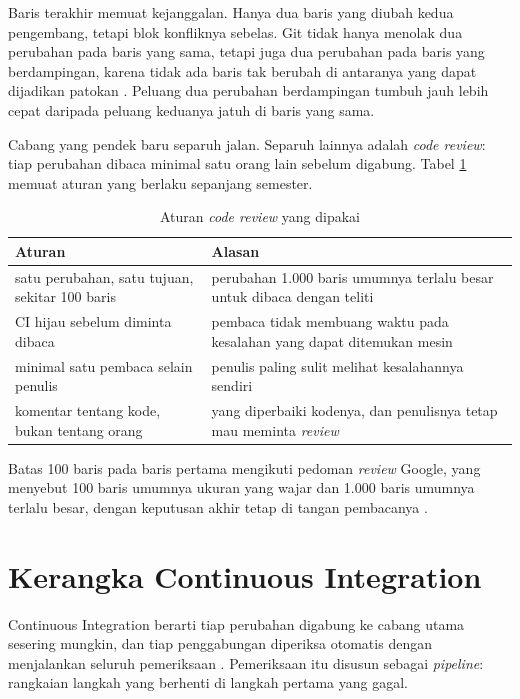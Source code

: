 Baris terakhir memuat kejanggalan. Hanya dua baris yang diubah kedua
pengembang, tetapi blok konfliknya sebelas. Git tidak hanya menolak dua
perubahan pada baris yang sama, tetapi juga dua perubahan pada baris yang
berdampingan, karena tidak ada baris tak berubah di antaranya yang dapat
dijadikan patokan \cite{chacon2014progit}. Peluang dua perubahan berdampingan
tumbuh jauh lebih cepat daripada peluang keduanya jatuh di baris yang sama.

Cabang yang pendek baru separuh jalan. Separuh lainnya adalah
\textit{code review}: tiap perubahan dibaca minimal satu orang lain sebelum
digabung. Tabel \ref{tab:review01} memuat aturan yang berlaku sepanjang
semester.

\begin{table}[!htb]
  \centering
  \caption{Aturan \textit{code review} yang dipakai}
  \label{tab:review01}
  \begin{tabularx}{\textwidth}{XX}
    \hline
    \textbf{Aturan} & \textbf{Alasan} \\
    \hline
    satu perubahan, satu tujuan, sekitar 100 baris & perubahan 1.000 baris umumnya terlalu besar untuk dibaca dengan teliti \\
    \hline
    CI hijau sebelum diminta dibaca & pembaca tidak membuang waktu pada kesalahan yang dapat ditemukan mesin \\
    \hline
    minimal satu pembaca selain penulis & penulis paling sulit melihat kesalahannya sendiri \\
    \hline
    komentar tentang kode, bukan tentang orang & yang diperbaiki kodenya, dan penulisnya tetap mau meminta \textit{review} \\
    \hline
  \end{tabularx}
\end{table}

Batas 100 baris pada baris pertama mengikuti pedoman \textit{review} Google,
yang menyebut 100 baris umumnya ukuran yang wajar dan 1.000 baris umumnya
terlalu besar, dengan keputusan akhir tetap di tangan pembacanya
\cite{google-small-cls}.

\section{Kerangka Continuous Integration}

Continuous Integration berarti tiap perubahan digabung ke cabang utama
sesering mungkin, dan tiap penggabungan diperiksa otomatis dengan menjalankan
seluruh pemeriksaan \cite{humble2010cd}. Pemeriksaan itu disusun sebagai
\textit{pipeline}: rangkaian langkah yang berhenti di langkah pertama yang
gagal.

